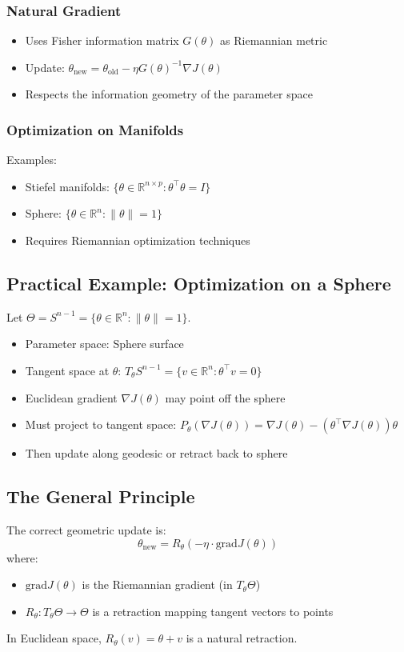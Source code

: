 \begin{notechapter}
\subsubsection{Natural Gradient}
\begin{itemize}
\item Uses Fisher information matrix $G(\theta)$ as Riemannian metric
\item Update: $\theta_{\text{new}} = \theta_{\text{old}} - \eta G(\theta)^{-1} \nabla J(\theta)$
\item Respects the information geometry of the parameter space
\end{itemize}

\subsubsection{Optimization on Manifolds}
Examples:
\begin{itemize}
\item Stiefel manifolds: $\{\theta \in \mathbb{R}^{n \times p} : \theta^\top\theta = I\}$
\item Sphere: $\{\theta \in \mathbb{R}^n : \|\theta\| = 1\}$
\item Requires Riemannian optimization techniques
\end{itemize}

\subsection{Practical Example: Optimization on a Sphere}

Let $\Theta = S^{n-1} = \{\theta \in \mathbb{R}^n : \|\theta\| = 1\}$.

\begin{itemize}
\item Parameter space: Sphere surface
\item Tangent space at $\theta$: $T_\theta S^{n-1} = \{v \in \mathbb{R}^n : \theta^\top v = 0\}$
\item Euclidean gradient $\nabla J(\theta)$ may point off the sphere
\item Must project to tangent space: $P_\theta(\nabla J(\theta)) = \nabla J(\theta) - (\theta^\top \nabla J(\theta))\theta$
\item Then update along geodesic or retract back to sphere
\end{itemize}

\subsection{The General Principle}

The correct geometric update is:
\[
\theta_{\text{new}} = R_\theta(-\eta \cdot \text{grad} J(\theta))
\]
where:
\begin{itemize}
\item $\text{grad} J(\theta)$ is the Riemannian gradient (in $T_\theta\Theta$)
\item $R_\theta: T_\theta\Theta \to \Theta$ is a retraction mapping tangent vectors to points
\end{itemize}

In Euclidean space, $R_\theta(v) = \theta + v$ is a natural retraction.
\end{notechapter}
